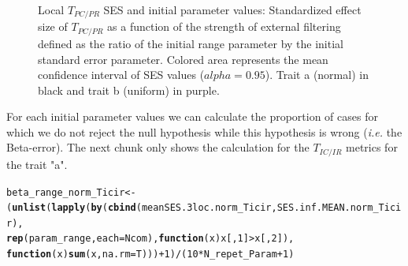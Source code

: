 \documentclass[12pt]{article}\usepackage[]{graphicx}\usepackage[]{color}
\makeatletter
\newcommand{\hlnum}[1]{\textcolor[rgb]{0.686,0.059,0.569}{#1}}%
\newcommand{\hlopt}[1]{\textcolor[rgb]{0,0,0}{#1}}%
\newcommand{\hlstd}[1]{\textcolor[rgb]{0.345,0.345,0.345}{#1}}%
\newcommand{\hlkwa}[1]{\textcolor[rgb]{0.161,0.373,0.58}{\textbf{#1}}}%
\newcommand{\hlkwb}[1]{\textcolor[rgb]{0.69,0.353,0.396}{#1}}%
\newcommand{\hlkwc}[1]{\textcolor[rgb]{0.333,0.667,0.333}{#1}}%
\newcommand{\hlkwd}[1]{\textcolor[rgb]{0.737,0.353,0.396}{\textbf{#1}}}%
\newenvironment{kframe}{%
 \def\at@end@of@kframe{}%
 \ifinner\ifhmode%
  \def\at@end@of@kframe{\end{minipage}}%
  \begin{minipage}{\columnwidth}%
 \fi\fi%
 \def\FrameCommand##1{\hskip\@totalleftmargin \hskip-\fboxsep
 \colorbox{shadecolor}{##1}\hskip-\fboxsep
     \hskip-\linewidth \hskip-\@totalleftmargin \hskip\columnwidth}%
 \MakeFramed {\advance\hsize-\width
   \@totalleftmargin\z@ \linewidth\hsize
   \@setminipage}}%
 {\par\unskip\endMakeFramed%
 \at@end@of@kframe}
\newenvironment{knitrout}{}{} %
\makeatother
\begin{document}
\begin{knitrout}
\begin{figure}
{}

\caption[Local $T_{PC/PR}$ SES and initial parameter values]{Local $T_{PC/PR}$ SES and initial parameter values: Standardized effect size of $T_{PC/PR}$ as a function of the strength of external filtering defined as the ratio of the initial range parameter by the initial standard error parameter. Colored area represents the mean confidence interval of SES values ($alpha = 0.95$). Trait a (normal) in black and trait b (uniform) in purple.}\label{fig:Ex_filter_results_plot_initparam2}
\end{figure}


\end{knitrout}
 
For each initial parameter values we can calculate the proportion of cases for which we do not reject the null hypothesis while this hypothesis is wrong (\textit{i.e.} the Beta-error). The next chunk only shows the calculation for the $T_{IC/IR}$ metrics for the trait "a".

\begin{knitrout}\small
{}\color{fgcolor}\begin{kframe}
\begin{alltt}
\hlstd{beta_range_norm_Ticir} \hlkwb{<-}
 \hlstd{(}\hlkwd{unlist}\hlstd{(}\hlkwd{lapply}\hlstd{(}\hlkwd{by}\hlstd{(}\hlkwd{cbind}\hlstd{(meanSES.3loc.norm_Ticir, SES.inf.MEAN.norm_Ticir),}
     \hlkwd{rep}\hlstd{(param_range,} \hlkwc{each} \hlstd{= Ncom),} \hlkwa{function}\hlstd{(}\hlkwc{x}\hlstd{) x[,}\hlnum{1}\hlstd{]} \hlopt{>} \hlstd{x[,}\hlnum{2}\hlstd{]),}
     \hlkwa{function}\hlstd{(}\hlkwc{x}\hlstd{)} \hlkwd{sum}\hlstd{(x,} \hlkwc{na.rm} \hlstd{= T)))}\hlopt{+}\hlnum{1}\hlstd{)}\hlopt{/}\hlstd{(}\hlnum{10} \hlopt{*} \hlstd{N_repet_Param} \hlopt{+} \hlnum{1}\hlstd{)}
\end{alltt}
\end{kframe}
\end{knitrout}
\end{document}
